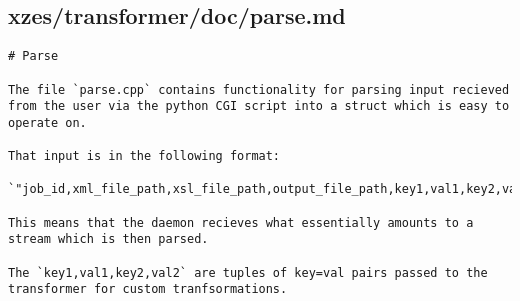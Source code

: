 \subsection{xzes/transformer/doc/parse.md}
\begin{lstlisting}[caption={Documentation about the parsing code.}]
# Parse

The file `parse.cpp` contains functionality for parsing input recieved from the user via the python CGI script into a struct which is easy to operate on.

That input is in the following format:

`"job_id,xml_file_path,xsl_file_path,output_file_path,key1,val1,key2,val2,key3,..."`

This means that the daemon recieves what essentially amounts to a stream which is then parsed.

The `key1,val1,key2,val2` are tuples of key=val pairs passed to the transformer for custom tranfsormations.
\end{lstlisting}
